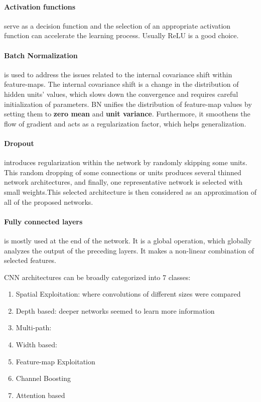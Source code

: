 \paragraph{Activation functions} serve as a decision function and the selection of an appropriate activation function can accelerate the learning process. Usually ReLU is a good choice.

\paragraph{Batch Normalization} is used to address the issues related to the internal covariance shift within feature-maps. The internal covariance shift is a change in the distribution of hidden units' values, which slows down the convergence and requires careful initialization of parameters. BN unifies the distribution of feature-map values by setting them to \textbf{zero mean} and \textbf{unit variance}. Furthermore, it smoothens the flow of gradient and acts as a regularization factor, which helps generalization.

\paragraph{Dropout} introduces regularization within the network by randomly skipping some units. This random dropping of some connections or units produces several thinned network architectures, and finally, one representative network is selected with small weights.This selected architecture is then considered as an approximation of all of the proposed networks.

\paragraph{Fully connected layers} is mostly used at the end of the network. It is a global operation, which globally analyzes the output of the preceding layers. It makes a non-linear combination of selected features.


CNN architectures can be broadly categorized into 7 classes:
\begin{enumerate}
    \item Spatial Exploitation: where convolutions of different sizes were compared
    \item Depth based: deeper networks seemed to learn more information
    \item Multi-path: 
    
    \item Width based:
    
    \item Feature-map Exploitation
    
    \item Channel Boosting
    
    
    \item Attention based
\end{enumerate}{}

